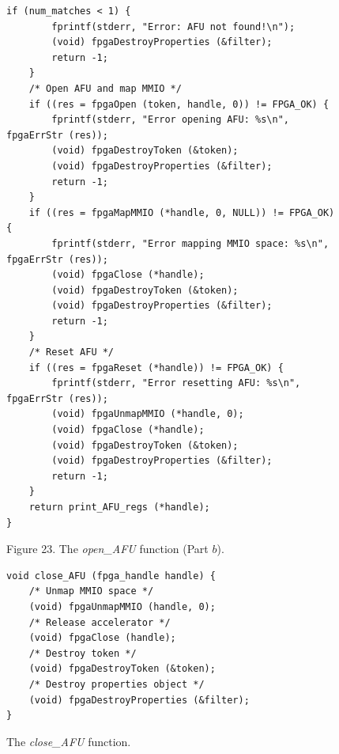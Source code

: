 \documentclass[11pt, twoside, pdftex]{article}
\newcommand{\commonPath}{../../Common}
\begin{document}
\lstset{language=C,numbers=none,escapechar=|}
\begin{figure}[h]
\begin{minipage}[h]{\textwidth}
\begin{lstlisting}[name=AFU]
    if (num_matches < 1) {
        fprintf(stderr, "Error: AFU not found!\n");
        (void) fpgaDestroyProperties (&filter);
        return -1;
    }
    /* Open AFU and map MMIO */
    if ((res = fpgaOpen (token, handle, 0)) != FPGA_OK) {
        fprintf(stderr, "Error opening AFU: %s\n", fpgaErrStr (res));
        (void) fpgaDestroyToken (&token);
        (void) fpgaDestroyProperties (&filter);
        return -1;
    }
    if ((res = fpgaMapMMIO (*handle, 0, NULL)) != FPGA_OK) {
        fprintf(stderr, "Error mapping MMIO space: %s\n", fpgaErrStr (res));
        (void) fpgaClose (*handle);
        (void) fpgaDestroyToken (&token);
        (void) fpgaDestroyProperties (&filter);
        return -1;
    }
    /* Reset AFU */
    if ((res = fpgaReset (*handle)) != FPGA_OK) {
        fprintf(stderr, "Error resetting AFU: %s\n", fpgaErrStr (res));
        (void) fpgaUnmapMMIO (*handle, 0);
        (void) fpgaClose (*handle);
        (void) fpgaDestroyToken (&token);
        (void) fpgaDestroyProperties (&filter);
        return -1;
    }
    return print_AFU_regs (*handle);
}
\end{lstlisting}
\begin{center}
Figure 23. The {\it open\_AFU} function (Part $b$).
\end{center}
\end{minipage}
\end{figure}

\lstset{language=C,numbers=none,escapechar=|}
\begin{figure}[h]
\begin{center}
\begin{minipage}[h]{12.5 cm}
\begin{lstlisting}[name=manage]
void close_AFU (fpga_handle handle) {
    /* Unmap MMIO space */
    (void) fpgaUnmapMMIO (handle, 0);
    /* Release accelerator */
    (void) fpgaClose (handle);
    /* Destroy token */
    (void) fpgaDestroyToken (&token);
    /* Destroy properties object */
    (void) fpgaDestroyProperties (&filter);
}
\end{lstlisting}
\end{minipage}
\caption{The {\it close\_AFU} function.}
\label{fig:close}
\end{center}
\end{figure}



\end{document}
